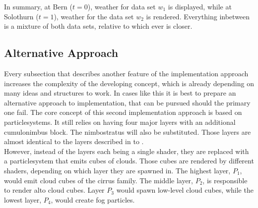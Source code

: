 \noindent
In summary,  at Bern ($t = 0$), weather for data set $w_1$ is displayed, while at Solothurn ($t = 1$), weather for the data set $w_2$ is rendered.
Everything inbetween is a mixture of both data sets, relative to which ever is closer.

\pagebreak

\subsection{Alternative Approach}
\label{section:impl:altapproach}
Every subsection that describes another feature of the implementation approach increases the complexity of the developing concept,
which is already depending on many ideas and structures to work.
In cases like this it is best to prepare an alternative approach to implementation, that can be pursued should the primary one fail.
\emptyline
The core concept of this second implementation approach is based on \gls{particlesystem}s.
It still relies on having four major layers with an additional cumulonimbus block. The nimbostratus will also be substituted.
Those layers are almost identical to the layers described in  to .
\\
However, instead of the layers each being a single \gls{shader}, they are replaced with a \gls{particlesystem} that emits cubes of clouds.
Those cubes are rendered by different \gls{shader}s, depending on which layer they are spawned in.
The highest layer, \color{darkercyan}$P_1$\color{black}, would emit cloud cubes of the cirrus family.
The middle layer, \color{darkercyan}$P_2$\color{black}, is responsible to render alto cloud cubes.
Layer \color{darkercyan}$P_3$ \color{black} would spawn low-level cloud cubes, while the lowest layer, \color{darkercyan}$P_4$\color{black}, would create fog particles.

